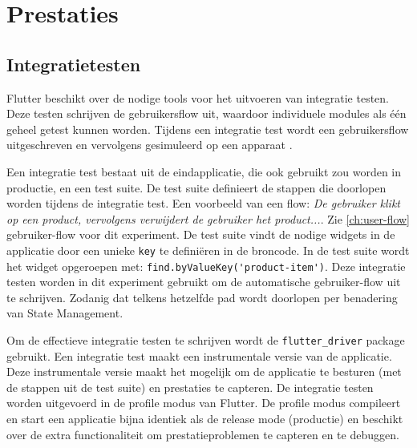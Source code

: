 \section{Prestaties}
\label{ch:prestaties}
\subsection{Integratietesten}
Flutter beschikt over de nodige tools voor het uitvoeren van integratie testen. Deze testen schrijven de gebruikersflow uit, waardoor individuele modules als één geheel getest kunnen worden. Tijdens een integratie test wordt een gebruikersflow uitgeschreven en vervolgens gesimuleerd op een apparaat \autocite{Flutter2019b}. \newline 

Een integratie test bestaat uit de eindapplicatie, die ook gebruikt zou worden in productie, en een test suite. De test suite definieert de stappen die doorlopen worden tijdens de integratie test. Een voorbeeld van een flow: \textit{De gebruiker klikt op een product, vervolgens verwijdert de gebruiker het product...}. Zie \ref{ch:user-flow} gebruiker-flow voor dit experiment. De test suite vindt de nodige widgets in de applicatie door een unieke \verb|key| te definiëren in de broncode. In de test suite wordt het widget opgeroepen met: \verb|find.byValueKey('product-item')|. \newline
Deze integratie testen worden in dit experiment gebruikt om de automatische gebruiker-flow uit te schrijven. Zodanig dat telkens hetzelfde pad wordt doorlopen per benadering van State Management.

Om de effectieve integratie testen te schrijven wordt de \verb|flutter_driver| package gebruikt.
Een integratie test maakt een instrumentale versie van de applicatie. Deze instrumentale versie maakt het mogelijk om de applicatie te besturen (met de stappen uit de test suite) en prestaties te capteren.
De integratie testen worden uitgevoerd in de profile modus van Flutter. De profile modus compileert en start een applicatie bijna identiek als de release mode (productie) en beschikt over de extra functionaliteit om prestatieproblemen te capteren en te debuggen.

